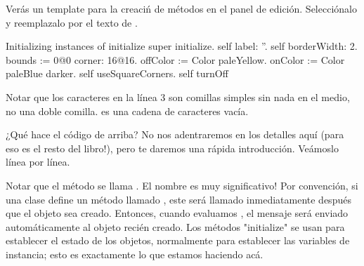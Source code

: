 \documentclass[a4paper,10pt,twoside]{book}
\begin{document}
Verás un template para la creaciń de métodos en el panel de edición.
Selecciónalo y reemplazalo por el texto de .


\begin{numMethod}[scbecellinitialize]{Initializing instances of }
initialize
   super initialize.
   self label: ''.
   self borderWidth: 2.
   bounds := 0@0 corner: 16@16.
   offColor := Color paleYellow.
   onColor := Color paleBlue darker.
   self useSquareCorners.
   self turnOff
\end{numMethod}


\noindent
Notar que los caracteres  en la línea 3 son comillas simples sin nada en el medio, no una doble comilla.  es una cadena de caracteres vacía. 




¿Qué hace el código de arriba? No nos adentraremos en los detalles aquí (para eso es el resto del libro!), pero te daremos una rápida introducción. Veámoslo línea por línea.


Notar que el método se llama .
El nombre es muy significativo!
Por convención, si una clase define un método llamado , este será llamado inmediatamente después que el objeto sea creado. 
Entonces, cuando evaluamos , el mensaje  será enviado automáticamente al objeto recién creado. 
Los métodos "initialize" se usan para establecer el estado de los objetos, normalmente para establecer las variables de instancia; esto es exactamente lo que estamos haciendo acá. 
\end{document}
